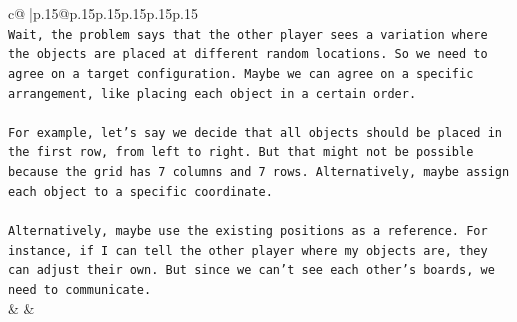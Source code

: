 \documentclass{article}
\begin{document}
{\begin{supertabular}{c@{$\;$}|p{.15\linewidth}@{}p{.15\linewidth}p{.15\linewidth}p{.15\linewidth}p{.15\linewidth}p{.15\linewidth}}
{{{\\ 
\texttt{Wait, the problem says that the other player sees a variation where the objects are placed at different random locations. So we need to agree on a target configuration. Maybe we can agree on a specific arrangement, like placing each object in a certain order.} \\
\\ 
\texttt{For example, let's say we decide that all objects should be placed in the first row, from left to right. But that might not be possible because the grid has 7 columns and 7 rows. Alternatively, maybe assign each object to a specific coordinate.} \\
\\ 
\texttt{Alternatively, maybe use the existing positions as a reference. For instance, if I can tell the other player where my objects are, they can adjust their own. But since we can't see each other's boards, we need to communicate.} \\
            }
        }
    }
    & & \\ \\


\end{supertabular}}
\end{document}
